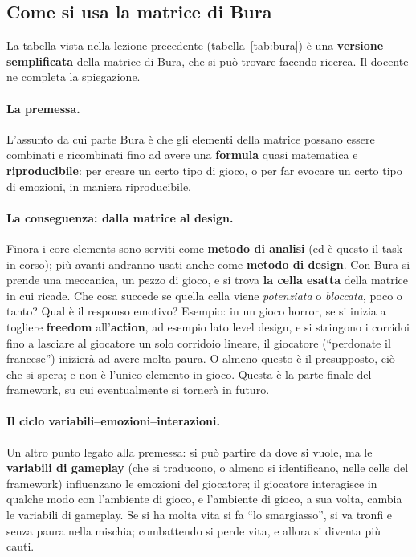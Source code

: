 \subsection{Come si usa la matrice di Bura}

La tabella vista nella lezione precedente (tabella~\ref{tab:bura}) è una
\textbf{versione semplificata} della matrice di Bura, che si può trovare
facendo ricerca. Il docente ne completa la spiegazione.

\paragraph{La premessa.} L'assunto da cui parte Bura è che gli elementi della
matrice possano essere combinati e ricombinati fino ad avere una
\textbf{formula} quasi matematica e \textbf{riproducibile}: per creare un
certo tipo di gioco, o per far evocare un certo tipo di emozioni, in maniera
riproducibile.

\paragraph{La conseguenza: dalla matrice al design.} Finora i core elements
sono serviti come \textbf{metodo di analisi} (ed è questo il task in corso);
più avanti andranno usati anche come \textbf{metodo di design}. Con Bura si
prende una meccanica, un pezzo di gioco, e si trova \textbf{la cella esatta}
della matrice in cui ricade. Che cosa succede se quella cella viene
\emph{potenziata} o \emph{bloccata}, poco o tanto? Qual è il responso
emotivo? Esempio: in un gioco horror, se si inizia a togliere
\textbf{freedom} all'\textbf{action}, ad esempio lato level design, e si
stringono i corridoi fino a lasciare al giocatore un solo corridoio lineare,
il giocatore (``perdonate il francese'') inizierà ad avere molta paura. O
almeno questo è il presupposto, ciò che si spera; e non è l'unico elemento in
gioco. Questa è la parte finale del framework, su cui eventualmente si
tornerà in futuro.

\paragraph{Il ciclo variabili--emozioni--interazioni.} Un altro punto legato
alla premessa: si può partire da dove si vuole, ma le \textbf{variabili di
gameplay} (che si traducono, o almeno si identificano, nelle celle del
framework) influenzano le emozioni del giocatore; il giocatore interagisce in
qualche modo con l'ambiente di gioco, e l'ambiente di gioco, a sua volta,
cambia le variabili di gameplay. Se si ha molta vita si fa ``lo smargiasso'',
si va tronfi e senza paura nella mischia; combattendo si perde vita, e allora
si diventa più cauti.

